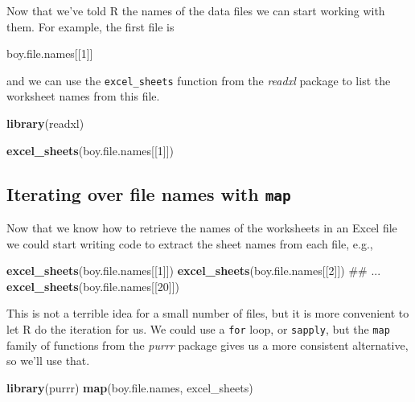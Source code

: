 \documentclass[]{book}
\newenvironment{Shaded}{\begin{snugshade}}{\end{snugshade}}
\newcommand{\KeywordTok}[1]{\textcolor[rgb]{0.13,0.29,0.53}{\textbf{#1}}}
\newcommand{\DecValTok}[1]{\textcolor[rgb]{0.00,0.00,0.81}{#1}}
\newcommand{\NormalTok}[1]{#1}
\begin{document}
Now that we've told R the names of the data files we can start working
with them. For example, the first file is

\begin{Shaded}
\begin{Highlighting}[]
\NormalTok{boy.file.names[[}\DecValTok{1}\NormalTok{]]}
\end{Highlighting}
\end{Shaded}

and we can use the \texttt{excel\_sheets} function from the
\emph{readxl} package to list the worksheet names from this file.

\begin{Shaded}
\begin{Highlighting}[]
\KeywordTok{library}\NormalTok{(readxl)}

\KeywordTok{excel_sheets}\NormalTok{(boy.file.names[[}\DecValTok{1}\NormalTok{]])}
\end{Highlighting}
\end{Shaded}

\subsection{\texorpdfstring{Iterating over file names with
\texttt{map}}{Iterating over file names with map}}\label{iterating-over-file-names-with-map}

Now that we know how to retrieve the names of the worksheets in an Excel
file we could start writing code to extract the sheet names from each
file, e.g.,

\begin{Shaded}
\begin{Highlighting}[]
\KeywordTok{excel_sheets}\NormalTok{(boy.file.names[[}\DecValTok{1}\NormalTok{]])}
\KeywordTok{excel_sheets}\NormalTok{(boy.file.names[[}\DecValTok{2}\NormalTok{]])}
\NormalTok{## ...}
\KeywordTok{excel_sheets}\NormalTok{(boy.file.names[[}\DecValTok{20}\NormalTok{]])}
\end{Highlighting}
\end{Shaded}

This is not a terrible idea for a small number of files, but it is more
convenient to let R do the iteration for us. We could use a \texttt{for}
loop, or \texttt{sapply}, but the \texttt{map} family of functions from
the \emph{purrr} package gives us a more consistent alternative, so
we'll use that.

\begin{Shaded}
\begin{Highlighting}[]
\KeywordTok{library}\NormalTok{(purrr)}
\KeywordTok{map}\NormalTok{(boy.file.names, excel_sheets)}
\end{Highlighting}
\end{Shaded}
\end{document}
